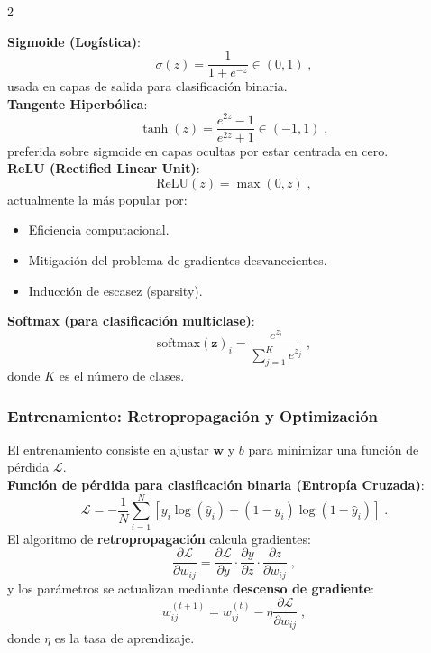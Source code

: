 \documentclass[12pt]{report}
\newenvironment{tightmulticols}{%
  \begin{multicols}{2}
  \setlength{\parskip}{1.2pt}
  \linespread{1}\selectfont
}{%
  \end{multicols}
}
\begin{document}
\begin{tightmulticols}
\noindent\textbf{Sigmoide (Logística)}:
\begin{equation*}
    \sigma(z) = \frac{1}{1 + e^{-z}} \in (0, 1) \; ,
\end{equation*}
\noindent usada en capas de salida para clasificación binaria.\\

\noindent\textbf{Tangente Hiperbólica}:
\begin{equation*}
    \tanh(z) = \frac{e^{2z} - 1}{e^{2z} + 1} \in (-1, 1) \; ,
\end{equation*}
\noindent preferida sobre sigmoide en capas ocultas por estar centrada en cero.\\

\noindent\textbf{ReLU (Rectified Linear Unit)}:
\begin{equation*}
    \text{ReLU}(z) = \max(0, z) \; ,
\end{equation*}
\noindent actualmente la más popular por:
\begin{itemize}
    \item Eficiencia computacional.
    \item Mitigación del problema de gradientes desvanecientes.
    \item Inducción de escasez (sparsity).
\end{itemize}

\noindent\textbf{Softmax (para clasificación multiclase)}:
\begin{equation*}
    \text{softmax}(\mathbf{z})_i = \frac{e^{z_i}}{\sum_{j=1}^{K} e^{z_j}} \; ,
\end{equation*}
\noindent donde $K$ es el número de clases.

\subsubsection{Entrenamiento: Retropropagación y Optimización}

\noindent El entrenamiento consiste en ajustar $\mathbf{w}$ y $b$ para minimizar una función de pérdida $\mathcal{L}$.\\

\noindent\textbf{Función de pérdida para clasificación binaria (Entropía Cruzada)}:
\begin{equation*}
    \mathcal{L} = -\frac{1}{N}\sum_{i=1}^{N} [y_i \log(\hat{y}_i) + (1-y_i)\log(1-\hat{y}_i)] \; .
\end{equation*}
\noindent El algoritmo de \textbf{retropropagación} calcula gradientes:
\begin{equation*}
    \frac{\partial \mathcal{L}}{\partial w_{ij}} = \frac{\partial \mathcal{L}}{\partial y} \cdot \frac{\partial y}{\partial z} \cdot \frac{\partial z}{\partial w_{ij}} \; ,
\end{equation*}
\noindent y los parámetros se actualizan mediante \textbf{descenso de gradiente}:
\begin{equation*}
    w_{ij}^{(t+1)} = w_{ij}^{(t)} - \eta \frac{\partial \mathcal{L}}{\partial w_{ij}} \; ,
\end{equation*}
donde $\eta$ es la tasa de aprendizaje.


\end{tightmulticols}
\end{document}

